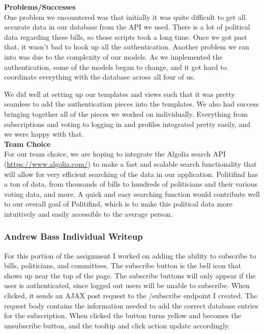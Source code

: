 \documentclass{article}
\newcommand{\n}{\noindent}
\begin{document}
\n\textbf{Problems/Successes} \\

One problem we encountered was that initially it was quite difficult to get all accurate data in our database from the API we used. There is a lot of political data regarding these bills, so those scripts took a long time. Once we got past that, it wasn't bad to hook up all the authentication. Another problem we ran into was due to the complexity of our models. As we implemented the authentication, some of the models began to change, and it got hard to coordinate everything with the database across all four of us.

We did well at setting up our templates and views such that it was pretty seamless to add the authentication pieces into the templates. We also had success bringing together all of the pieces we worked on individually. Everything from subscriptions and voting to logging in and profiles integrated pretty easily, and we were happy with that.\\

\n\textbf{Team Choice} \\

For our team choice, we are hoping to integrate the Algolia search API (\url{https://www.algolia.com/}) to make a fast and scalable search functionality that will allow for very efficient searching of the data in our application. Politifind has a ton of data, from thousands of bills to hundreds of politicians and their various voting data, and more. A quick and easy searching function would contribute well to our overall goal of Politifind, which is to make this political data more intuitively and easily accessible to the average person.

\pagebreak

\subsubsection*{Andrew Bass Individual Writeup}
For this portion of the assignment I worked on adding the ability to subscribe to bills, politicians, and committees.  The subscribe button is the bell icon that shows up near
the top of the page. The subscribe buttons will only appear if the user is authenticated, since logged out users will be unable
to subscribe.  When clicked, it sends an AJAX post request to the /subscribe endpoint I created.  The request body contains the information
needed to add the correct database entries for the subscription.  When clicked the button turns yellow and becomes the unsubscribe button, and the tooltip and click action
update accordingly. 
\end{document}
